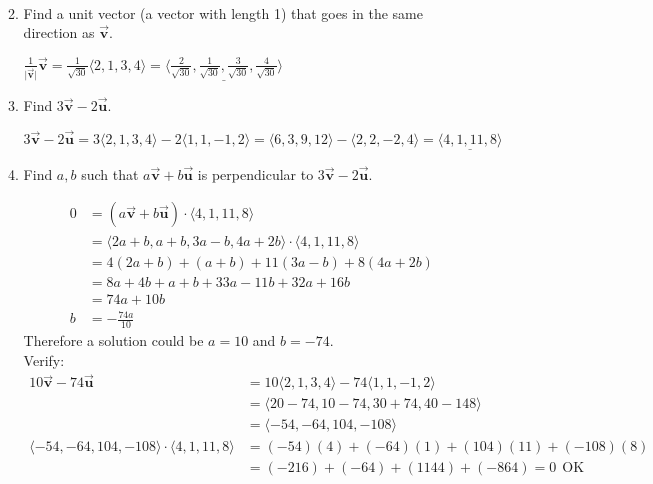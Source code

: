 \documentclass{letter}
\newcommand{\norm}[1]{\lvert #1 \rvert}
\newcommand{\Ve}[1]{\langle #1 \rangle}
\newcommand{\Vn}[1]{\vec{\bm{#1}}}
\newcommand\Que[1]{%
   \leavevmode\noindent
   #1
}
\newcommand\Ans[2][]{%
   \leavevmode\noindent
   {
       \begin{mdframed}[backgroundcolor=blue!10]
       #2
       \end{mdframed}
   }
}
\begin{document}
\begin{enumerate}
\begin{enumerate}[label=(\alph*)]
{\begin{align*}
      \end{align*}
    }
    \item \Que{Find a unit vector (a vector with length 1) that goes in the same direction as $\Vn{v}$.}
    \Ans{
         $
         \frac{1}{\norm{\Vn{v}}}\Vn{v}=\frac{1}{\sqrt{30}}\Ve{2,1,3,4}
         = \underline{\Ve{\frac{2}{\sqrt{30}},\frac{1}{\sqrt{30}},\frac{3}{\sqrt{30}},\frac{4}{\sqrt{30}}}} 
         $    
    }
    \item \Que{Find $3\Vn{v}-2\Vn{u}$.}
    \Ans{
        $3\Vn{v}-2\Vn{u}=3\Ve{2,1,3,4}-2\Ve{1,1,-1,2}=\Ve{6,3,9,12}-\Ve{2,2,-2,4}=\underline{\Ve{4,1,11,8}}$    
    }
    \item \Que{Find $a,b$ such that $a\Vn{v}+b\Vn{u}$ is perpendicular to $3\Vn{v}-2\Vn{u}$.}
    \Ans{
      \begin{align*}
        0&=(a\Vn{v}+b\Vn{u})\cdot\Ve{4,1,11,8} \\
         &=\Ve{2a+b,a+b,3a-b,4a+2b}\cdot\Ve{4,1,11,8} \\
         &=4(2a+b)+(a+b)+11(3a-b)+8(4a+2b) \\
         &=8a+4b+a+b+33a-11b+32a+16b \\
         &=74a+10b \\
        b&=-\frac{74a}{10} 
      \end{align*}
      Therefore a solution could be $a=10$ and $b=-74$. \\
      Verify: 
      \begin{align*}
      10\Vn{v}-74\Vn{u} &= 10\Ve{2,1,3,4}-74\Ve{1,1,-1,2} \\
                        &= \Ve{20-74,10-74,30+74,40-148}  \\
                        &= \Ve{-54,-64,104,-108} \\
      \Ve{-54,-64,104,-108}\cdot\Ve{4,1,11,8} &= (-54)(4)+(-64)(1)+(104)(11)+(-108)(8) \\
                                              &= (-216) + (-64) + (1144) + (-864) = 0 ~~ \text{OK} 
      \end{align*}
    }
    \end{enumerate}
\end{enumerate} 
\end{document}
